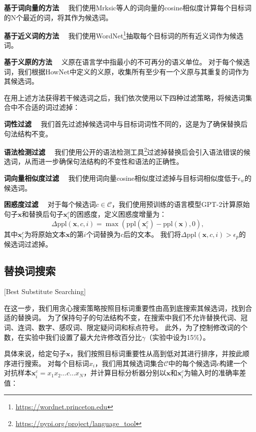\textbf{基于词向量的方法} \ \ 我们使用Mrksic等人的词向量\cite{mrksic2016counter}的cosine相似度计算每个目标词的N个最近的词，将其作为候选词。

\textbf{基于近义词的方法} \ \ 我们使用WordNet\footnote{\url{https://wordnet.princeton.edu}}抽取每个目标词的所有近义词作为候选词。

\textbf{基于义原的方法} \ \ 义原在语言学中指最小的不可再分的语义单位。\cite{dong2006hownet} 对于每个候选词，我们根据HowNet中定义的义原，收集所有至少有一个义原与其重复的词作为其候选词。

在用上述方法获得若干候选词之后，我们依次使用以下四种过滤策略，将候选词集合中不合适的词过滤掉：

\textbf{词性过滤} \ \ 我们首先过滤掉候选词中与目标词词性不同的，这是为了确保替换后句法结构不变。

\textbf{语法检测过滤} \ \ 我们使用公开的语法检测工具\footnote{\url{https://pypi.org/project/language_tool}}过滤掉替换后会引入语法错误的候选词，从而进一步确保句法结构的不变性和语法的正确性。


\textbf{词向量相似度过滤} \ \ 我们使用词向量cosine相似度过滤掉与目标词相似度低于$\epsilon_w$的候选词。

\textbf{困惑度过滤} \ \ 对于每个候选词$c \in \mathcal{C}$，我们使用预训练的语言模型GPT-2计算原始句子$\bm{x}$和替换后句子$\bm{x}^c_{i}$的困惑度，定义困惑度增量为：
\begin{equation}
	\label{eq:ppl-inc}
	\Delta \text{ppl}(\bm{x},c,i)=\max(\text{ppl}(\bm{x}^c_{i})-\text{ppl}(\bm{x}), 0),
\end{equation}
其中$\bm{x}^c_{i}$为将原始文本$\bm{x}$的第$i$个词替换为$c$后的文本。
我们将$\Delta\text{ppl}(\bm{x},c,i) > \epsilon_p$的候选词过滤掉。


\subsection{替换词搜索}[Best Substitute Searching]

在这一步，我们用贪心搜索策略按照目标词重要性由高到底搜索其候选词，找到合适的替换词。
为了保持句子的句法结构不变，在搜索中我们不允许替换代词、冠词、连词、数字、感叹词、限定疑问词和标点符号。
此外，为了控制修改词的个数，在实验中我们设置了最大允许修改百分比$\gamma$（实验中设为15\%）。

具体来说，给定句子$\bm{x}$，我们按照目标词重要性从高到低对其进行排序，并按此顺序进行搜索。
对每个目标词$x_i$，我们用其候选词集合$\mathcal{C}$中的每个候选词$c$构建一个对抗样本$\bm{x}^c_{i} = x_1x_2\dots c\dots x_N$，并计算目标分析器分别以$\bm{x}$和$\bm{x}^c_{i}$为输入时的准确率差值：

